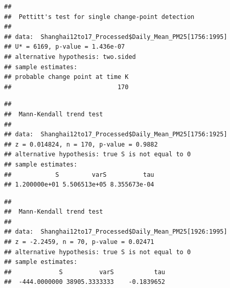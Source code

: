 \documentclass[12pt,]{article}
\newenvironment{Shaded}{\begin{snugshade}}{\end{snugshade}}
\newcommand{\KeywordTok}[1]{\textcolor[rgb]{0.13,0.29,0.53}{\textbf{#1}}}
\newcommand{\DecValTok}[1]{\textcolor[rgb]{0.00,0.00,0.81}{#1}}
\newcommand{\OperatorTok}[1]{\textcolor[rgb]{0.81,0.36,0.00}{\textbf{#1}}}
\newcommand{\NormalTok}[1]{#1}
\begin{document}
\begin{Shaded}
\end{Shaded}

\begin{verbatim}
## 
##  Pettitt's test for single change-point detection
## 
## data:  Shanghai12to17_Processed$Daily_Mean_PM25[1756:1995]
## U* = 6169, p-value = 1.436e-07
## alternative hypothesis: two.sided
## sample estimates:
## probable change point at time K 
##                             170
\end{verbatim}

\begin{Shaded}
\end{Shaded}

\begin{verbatim}
## 
##  Mann-Kendall trend test
## 
## data:  Shanghai12to17_Processed$Daily_Mean_PM25[1756:1925]
## z = 0.014824, n = 170, p-value = 0.9882
## alternative hypothesis: true S is not equal to 0
## sample estimates:
##            S         varS          tau 
## 1.200000e+01 5.506513e+05 8.355673e-04
\end{verbatim}

\begin{Shaded}
\end{Shaded}

\begin{verbatim}
## 
##  Mann-Kendall trend test
## 
## data:  Shanghai12to17_Processed$Daily_Mean_PM25[1926:1995]
## z = -2.2459, n = 70, p-value = 0.02471
## alternative hypothesis: true S is not equal to 0
## sample estimates:
##             S          varS           tau 
##  -444.0000000 38905.3333333    -0.1839652
\end{verbatim}
\end{document}
